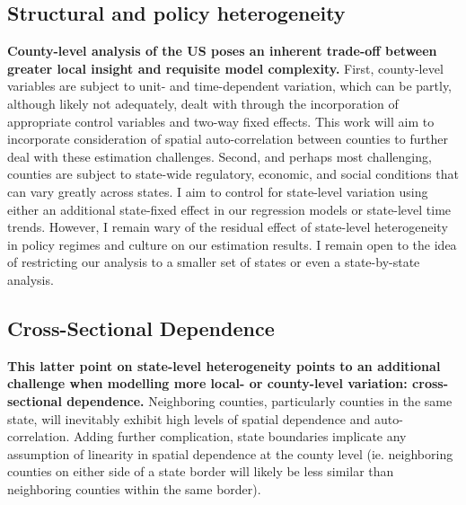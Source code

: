 \subsection{Structural and policy heterogeneity}

\textbf{County-level analysis of the US poses an inherent trade-off between greater local insight and requisite model complexity.} First, county-level variables are subject to unit- and time-dependent variation, which can be partly, although likely not adequately, dealt with through the incorporation of appropriate control variables and two-way fixed effects. This work will aim to incorporate consideration of spatial auto-correlation between counties to further deal with these estimation challenges. Second, and perhaps most challenging, counties are subject to state-wide regulatory, economic, and social conditions that can vary greatly across states. I aim to control for state-level variation using either an additional state-fixed effect in our regression models or state-level time trends. However, I remain wary of the residual effect of state-level heterogeneity in policy regimes and culture on our estimation results. I remain open to the idea of restricting our analysis to a smaller set of states or even a state-by-state analysis.

\subsection{Cross-Sectional Dependence}
\textbf{This latter point on state-level heterogeneity points to an additional challenge when modelling more local- or county-level variation: cross-sectional dependence.} Neighboring counties, particularly counties in the same state, will inevitably exhibit high levels of spatial dependence and auto-correlation. Adding further complication, state boundaries implicate any assumption of linearity in spatial dependence at the county level (ie. neighboring counties on either side of a state border will likely be less similar than neighboring counties within the same border).

